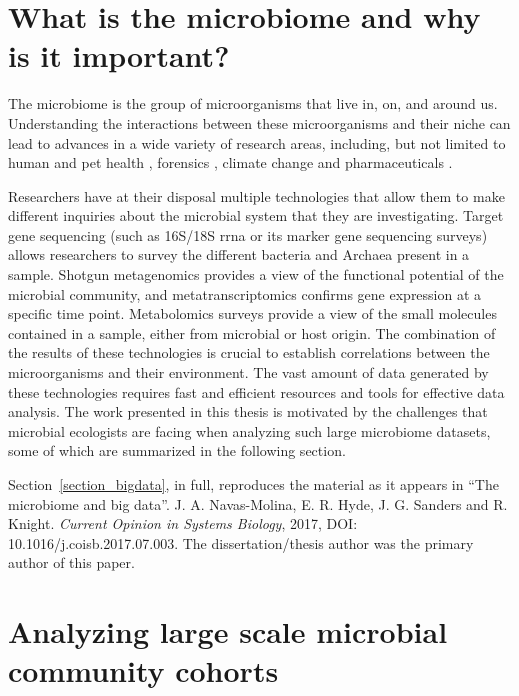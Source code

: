 \documentclass[12pt,chapterheads]{ucsd}
\begin{document}
%




\chapter{What is the microbiome and why is it important?}\label{chapter_overview}
\glsresetall

The microbiome is the group of microorganisms that live in, on, and around us.
Understanding the interactions between these microorganisms and their niche can
lead to advances in a wide variety of research areas, including, but not limited
to human and pet health \cite{Cox2015, Gevers2014, Vazquez-Baeza2016}, forensics
\cite{Fierer2010, Hyde2017}, climate change \cite{Tas2014} and pharmaceuticals
\cite{Novo2000, Maurice2013}.

Researchers have at their disposal multiple technologies that allow them to make
different inquiries about the microbial system that they are investigating.
Target gene sequencing (such as 16S/18S \gls{rrna} or \gls{its} marker gene
sequencing surveys) allows researchers to survey the different bacteria and
Archaea present in a sample. Shotgun metagenomics provides a view of the functional
potential of the microbial community, and metatranscriptomics confirms gene
expression at a specific time point. Metabolomics surveys provide a view of
the small molecules contained in a sample, either from microbial or host origin.
The combination of the results of these technologies is crucial to establish
correlations between the microorganisms and their environment. The vast amount
of data generated by these technologies requires fast and efficient resources
and tools for effective data analysis. The work presented in this thesis is
motivated by the challenges that microbial ecologists are facing when analyzing
such large microbiome datasets, some of which are summarized in the following
section.

Section~\ref{section_bigdata}, in full, reproduces the material as it
appears in ``The microbiome and big data''. J. A. Navas-Molina, E. R. Hyde,
J. G. Sanders and R. Knight. \emph{Current Opinion in Systems Biology},
2017, DOI: 10.1016/j.coisb.2017.07.003. The dissertation/thesis
author was the primary author of this paper.




\chapter{Analyzing large scale microbial community cohorts}\label{chapter_book}
\glsresetall
\end{document}
